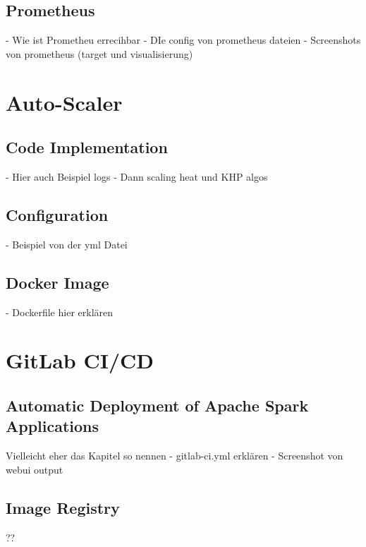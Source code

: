\subsection{Prometheus}
- Wie ist Prometheu errecihbar
- DIe config von prometheus dateien
- Screenshots von prometheus (target und visualisierung)



%
%


\section{Auto-Scaler}


\subsection{Code Implementation}
- Hier auch Beispiel logs
- Dann scaling heat und KHP algos


\subsection{Configuration}
- Beispiel von der yml Datei


\subsection{Docker Image}
- Dockerfile hier erklären


\section{GitLab CI/CD}


\subsection{Automatic Deployment of Apache Spark Applications}
Vielleicht eher das Kapitel so nennen
- gitlab-ci.yml erklären
- Screenshot von webui output


\subsection{Image Registry}
??

































